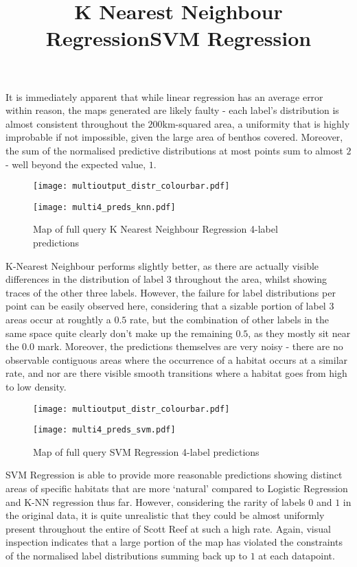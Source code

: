 It is immediately apparent that while linear regression has an average error within reason, the maps generated are likely faulty - each label's distribution is almost consistent throughout the $200$km-squared area, a uniformity that is highly improbable if not impossible, given the large area of benthos covered. Moreover, the sum of the normalised predictive distributions at most points sum to almost $2$ - well beyond the expected value, $1$.

\begin{figure}[H]
    \title{\large{\textbf{K Nearest Neighbour Regression}}}
    \centerline{\texttt{[image: multioutput\_distr\_colourbar.pdf]}}
    \centerline{\texttt{[image: multi4\_preds\_knn.pdf]}}
    \caption{Map of full query K Nearest Neighbour Regression 4-label predictions}
    \label{fig:multi4_rf}
\end{figure}

K-Nearest Neighbour performs slightly better, as there are actually visible differences in the distribution of label 3 throughout the area, whilst showing traces of the other three labels. However, the failure for label distributions per point can be easily observed here, considering that a sizable portion of label 3 areas occur at roughtly a $0.5$ rate, but the combination of other labels in the same space quite clearly don't make up the remaining $0.5$, as they mostly sit near the $0.0$ mark. Moreover, the predictions themselves are very noisy - there are no observable contiguous areas where the occurrence of a habitat occurs at a similar rate, and nor are there visible smooth transitions where a habitat goes from high to low density.

\begin{figure}[H]
    \title{\large{\textbf{SVM Regression}}}
    \centerline{\texttt{[image: multioutput\_distr\_colourbar.pdf]}}
    \centerline{\texttt{[image: multi4\_preds\_svm.pdf]}}
    \caption{Map of full query SVM Regression 4-label predictions}
    \label{fig:multi4_svr}
\end{figure}

SVM Regression is able to provide more reasonable predictions showing distinct areas of specific habitats that are more `natural' compared to Logistic Regression and K-NN regression thus far. However, considering the rarity of labels $0$ and $1$ in the original data, it is quite unrealistic that they could be almost uniformly present throughout the entire of Scott Reef at such a high rate. Again, visual inspection indicates that a large portion of the map has violated the constraints of the normalised label distributions summing back up to $1$ at each datapoint.

